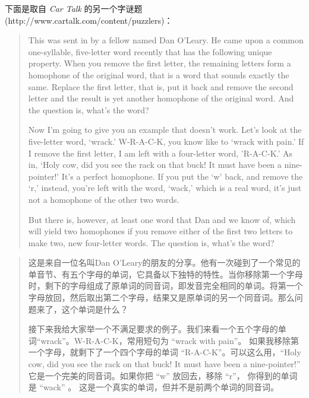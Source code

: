 \begin{exercise}

  


下面是取自 {\em Car Talk} 的另一个字谜题(http://www.cartalk.com/content/puzzlers)：

\begin{quote}
This was sent in by a fellow named Dan O'Leary. He came upon a common
one-syllable, five-letter word recently that has the following unique
property. When you remove the first letter, the remaining letters form
a homophone of the original word, that is a word that sounds exactly
the same. Replace the first letter, that is, put it back and remove
the second letter and the result is yet another homophone of the
original word. And the question is, what's the word?

Now I'm going to give you an example that doesn't work. Let's look at
the five-letter word, `wrack.' W-R-A-C-K, you know like to `wrack with
pain.' If I remove the first letter, I am left with a four-letter
word, 'R-A-C-K.' As in, `Holy cow, did you see the rack on that buck!
It must have been a nine-pointer!' It's a perfect homophone. If you
put the `w' back, and remove the `r,' instead, you're left with the
word, `wack,' which is a real word, it's just not a homophone of the
other two words.

But there is, however, at least one word that Dan and we know of,
which will yield two homophones if you remove either of the first two
letters to make two, new four-letter words. The question is, what's
the word?
\end{quote}

\begin{quote}

这是来自一位名叫Dan O'Leary的朋友的分享。他有一次碰到了一个常见的单音节、有五个字母的单词，它具备以下独特的特性。当你移除第一个字母时，剩下的字母组成了原单词的同音词，即发音完全相同的单词。将第一个字母放回，然后取出第二个字母，结果又是原单词的另一个同音词。那么问题来了，这个单词是什么？

接下来我给大家举一个不满足要求的例子。我们来看一个五个字母的单词``wrack''。W-R-A-C-K，常用短句为 ``wrack with pain''。 如果我移除第一个字母，就剩下了一个四个字母的单词 ``R-A-C-K''。可以这么用，``Holy cow, did you see the rack on that buck! It must have been a nine-pointer!'' 它是一个完美的同音词。如果你把 ``w'' 放回去，移除 ``r''， 你得到的单词是 ``wack'' 。 这是一个真实的单词，但并不是前两个单词的同音词。


\end{quote}
\end{exercise}
